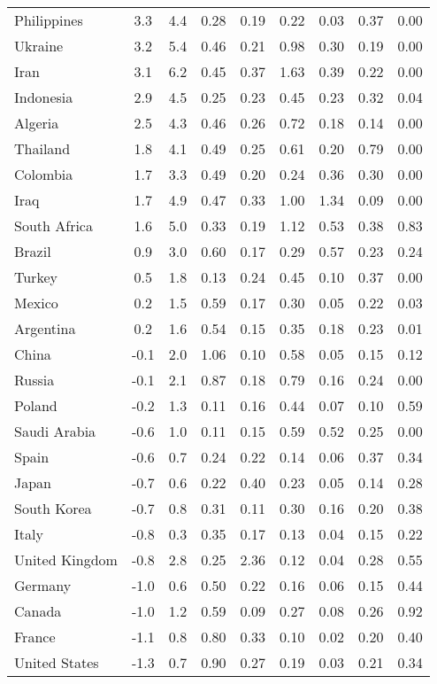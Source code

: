 \begin{tabular}[t]{lcccccccc}
Philippines & 3.3 & 4.4 & 0.28 & 0.19 & 0.22 & 0.03 & 0.37 & 0.00\\
Ukraine & 3.2 & 5.4 & 0.46 & 0.21 & 0.98 & 0.30 & 0.19 & 0.00\\
Iran & 3.1 & 6.2 & 0.45 & 0.37 & 1.63 & 0.39 & 0.22 & 0.00\\
Indonesia & 2.9 & 4.5 & 0.25 & 0.23 & 0.45 & 0.23 & 0.32 & 0.04\\
Algeria & 2.5 & 4.3 & 0.46 & 0.26 & 0.72 & 0.18 & 0.14 & 0.00\\
Thailand & 1.8 & 4.1 & 0.49 & 0.25 & 0.61 & 0.20 & 0.79 & 0.00\\
Colombia & 1.7 & 3.3 & 0.49 & 0.20 & 0.24 & 0.36 & 0.30 & 0.00\\
Iraq & 1.7 & 4.9 & 0.47 & 0.33 & 1.00 & 1.34 & 0.09 & 0.00\\
South Africa & 1.6 & 5.0 & 0.33 & 0.19 & 1.12 & 0.53 & 0.38 & 0.83\\
Brazil & 0.9 & 3.0 & 0.60 & 0.17 & 0.29 & 0.57 & 0.23 & 0.24\\
Turkey & 0.5 & 1.8 & 0.13 & 0.24 & 0.45 & 0.10 & 0.37 & 0.00\\
Mexico & 0.2 & 1.5 & 0.59 & 0.17 & 0.30 & 0.05 & 0.22 & 0.03\\
Argentina & 0.2 & 1.6 & 0.54 & 0.15 & 0.35 & 0.18 & 0.23 & 0.01\\
China & -0.1 & 2.0 & 1.06 & 0.10 & 0.58 & 0.05 & 0.15 & 0.12\\
Russia & -0.1 & 2.1 & 0.87 & 0.18 & 0.79 & 0.16 & 0.24 & 0.00\\
Poland & -0.2 & 1.3 & 0.11 & 0.16 & 0.44 & 0.07 & 0.10 & 0.59\\
Saudi Arabia & -0.6 & 1.0 & 0.11 & 0.15 & 0.59 & 0.52 & 0.25 & 0.00\\
Spain & -0.6 & 0.7 & 0.24 & 0.22 & 0.14 & 0.06 & 0.37 & 0.34\\
Japan & -0.7 & 0.6 & 0.22 & 0.40 & 0.23 & 0.05 & 0.14 & 0.28\\
South Korea & -0.7 & 0.8 & 0.31 & 0.11 & 0.30 & 0.16 & 0.20 & 0.38\\
Italy & -0.8 & 0.3 & 0.35 & 0.17 & 0.13 & 0.04 & 0.15 & 0.22\\
United Kingdom & -0.8 & 2.8 & 0.25 & 2.36 & 0.12 & 0.04 & 0.28 & 0.55\\
Germany & -1.0 & 0.6 & 0.50 & 0.22 & 0.16 & 0.06 & 0.15 & 0.44\\
Canada & -1.0 & 1.2 & 0.59 & 0.09 & 0.27 & 0.08 & 0.26 & 0.92\\
France & -1.1 & 0.8 & 0.80 & 0.33 & 0.10 & 0.02 & 0.20 & 0.40\\
United States & -1.3 & 0.7 & 0.90 & 0.27 & 0.19 & 0.03 & 0.21 & 0.34\\
\bottomrule 
\end{tabular}